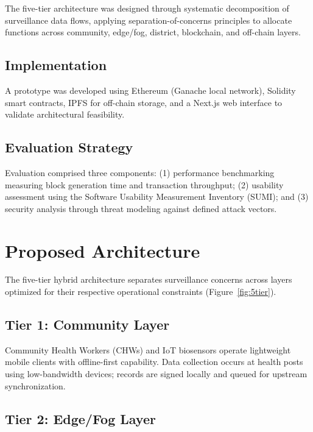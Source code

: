 \documentclass[AMA,LATO1COL]{WileyNJDv5}
\begin{document}
The five-tier architecture was designed through systematic decomposition of surveillance data flows, applying separation-of-concerns principles to allocate functions across community, edge/fog, district, blockchain, and off-chain layers.

\subsection{Implementation}

A prototype was developed using Ethereum (Ganache local network), Solidity smart contracts, IPFS for off-chain storage, and a Next.js web interface to validate architectural feasibility.

\subsection{Evaluation Strategy}

Evaluation comprised three components: (1) performance benchmarking measuring block generation time and transaction throughput; (2) usability assessment using the Software Usability Measurement Inventory (SUMI); and (3) security analysis through threat modeling against defined attack vectors.

\section{Proposed Architecture}\label{sec:architecture}

The five-tier hybrid architecture separates surveillance concerns across layers optimized for their respective operational constraints (Figure~\ref{fig:5tier}).

\subsection{Tier 1: Community Layer}

Community Health Workers (CHWs) and IoT biosensors operate lightweight mobile clients with offline-first capability. Data collection occurs at health posts using low-bandwidth devices; records are signed locally and queued for upstream synchronization.

\subsection{Tier 2: Edge/Fog Layer}
\end{document}
